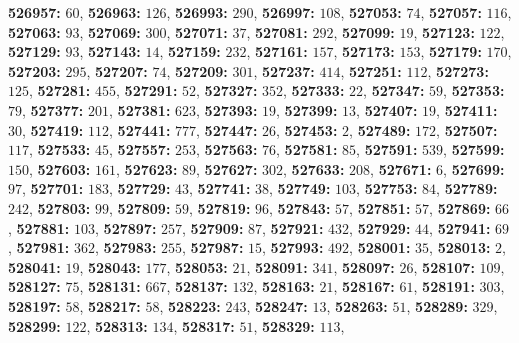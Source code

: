 \textsf{\bfseries 526957:} $60$, \textsf{\bfseries 526963:} $126$, \textsf{\bfseries 526993:} $290$, \textsf{\bfseries 526997:} $108$, \textsf{\bfseries 527053:} $74$, \textsf{\bfseries 527057:} $116$, \textsf{\bfseries 527063:} $93$, \textsf{\bfseries 527069:} $300$, \textsf{\bfseries 527071:} $37$, \textsf{\bfseries 527081:} $292$, \textsf{\bfseries 527099:} $19$, \textsf{\bfseries 527123:} $122$, \textsf{\bfseries 527129:} $93$, \textsf{\bfseries 527143:} $14$, \textsf{\bfseries 527159:} $232$, \textsf{\bfseries 527161:} $157$, \textsf{\bfseries 527173:} $153$, \textsf{\bfseries 527179:} $170$, \textsf{\bfseries 527203:} $295$, \textsf{\bfseries 527207:} $74$, \textsf{\bfseries 527209:} $301$, \textsf{\bfseries 527237:} $414$, \textsf{\bfseries 527251:} $112$, \textsf{\bfseries 527273:} $125$, \textsf{\bfseries 527281:} $455$, \textsf{\bfseries 527291:} $52$, \textsf{\bfseries 527327:} $352$, \textsf{\bfseries 527333:} $22$, \textsf{\bfseries 527347:} $59$, \textsf{\bfseries 527353:} $79$, \textsf{\bfseries 527377:} $201$, \textsf{\bfseries 527381:} $623$, \textsf{\bfseries 527393:} $19$, \textsf{\bfseries 527399:} $13$, \textsf{\bfseries 527407:} $19$, \textsf{\bfseries 527411:} $30$, \textsf{\bfseries 527419:} $112$, \textsf{\bfseries 527441:} $777$, \textsf{\bfseries 527447:} $26$, \textsf{\bfseries 527453:} $2$, \textsf{\bfseries 527489:} $172$, \textsf{\bfseries 527507:} $117$, \textsf{\bfseries 527533:} $45$, \textsf{\bfseries 527557:} $253$, \textsf{\bfseries 527563:} $76$, \textsf{\bfseries 527581:} $85$, \textsf{\bfseries 527591:} $539$, \textsf{\bfseries 527599:} $150$, \textsf{\bfseries 527603:} $161$, \textsf{\bfseries 527623:} $89$, \textsf{\bfseries 527627:} $302$, \textsf{\bfseries 527633:} $208$, \textsf{\bfseries 527671:} $6$, \textsf{\bfseries 527699:} $97$, \textsf{\bfseries 527701:} $183$, \textsf{\bfseries 527729:} $43$, \textsf{\bfseries 527741:} $38$, \textsf{\bfseries 527749:} $103$, \textsf{\bfseries 527753:} $84$, \textsf{\bfseries 527789:} $242$, \textsf{\bfseries 527803:} $99$, \textsf{\bfseries 527809:} $59$, \textsf{\bfseries 527819:} $96$, \textsf{\bfseries 527843:} $57$, \textsf{\bfseries 527851:} $57$, \textsf{\bfseries 527869:} $66$, \textsf{\bfseries 527881:} $103$, \textsf{\bfseries 527897:} $257$, \textsf{\bfseries 527909:} $87$, \textsf{\bfseries 527921:} $432$, \textsf{\bfseries 527929:} $44$, \textsf{\bfseries 527941:} $69$, \textsf{\bfseries 527981:} $362$, \textsf{\bfseries 527983:} $255$, \textsf{\bfseries 527987:} $15$, \textsf{\bfseries 527993:} $492$, \textsf{\bfseries 528001:} $35$, \textsf{\bfseries 528013:} $2$, \textsf{\bfseries 528041:} $19$, \textsf{\bfseries 528043:} $177$, \textsf{\bfseries 528053:} $21$, \textsf{\bfseries 528091:} $341$, \textsf{\bfseries 528097:} $26$, \textsf{\bfseries 528107:} $109$, \textsf{\bfseries 528127:} $75$, \textsf{\bfseries 528131:} $667$, \textsf{\bfseries 528137:} $132$, \textsf{\bfseries 528163:} $21$, \textsf{\bfseries 528167:} $61$, \textsf{\bfseries 528191:} $303$, \textsf{\bfseries 528197:} $58$, \textsf{\bfseries 528217:} $58$, \textsf{\bfseries 528223:} $243$, \textsf{\bfseries 528247:} $13$, \textsf{\bfseries 528263:} $51$, \textsf{\bfseries 528289:} $329$, \textsf{\bfseries 528299:} $122$, \textsf{\bfseries 528313:} $134$, \textsf{\bfseries 528317:} $51$, \textsf{\bfseries 528329:} $113$, 
